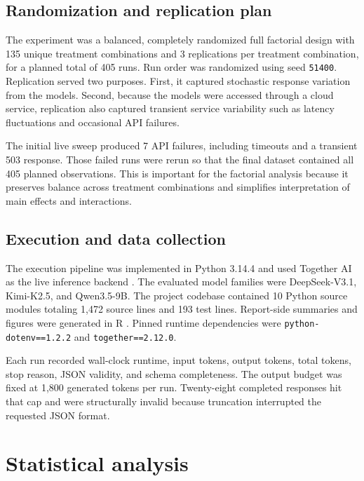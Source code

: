 \documentclass{article}
\begin{document}
\subsection{Randomization and replication plan}

The experiment was a balanced, completely randomized full factorial design with 135 unique treatment combinations and 3 replications per treatment combination, for a planned total of 405 runs. Run order was randomized using seed \texttt{51400}. Replication served two purposes. First, it captured stochastic response variation from the models. Second, because the models were accessed through a cloud service, replication also captured transient service variability such as latency fluctuations and occasional API failures.

The initial live sweep produced 7 API failures, including timeouts and a transient 503 response. Those failed runs were rerun so that the final dataset contained all 405 planned observations. This is important for the factorial analysis because it preserves balance across treatment combinations and simplifies interpretation of main effects and interactions.

\subsection{Execution and data collection}

The execution pipeline was implemented in Python 3.14.4 \cite{python} and used Together AI as the live inference backend \cite{togetherchat,togetherjson,togethermodels}. The evaluated model families were DeepSeek-V3.1, Kimi-K2.5, and Qwen3.5-9B. The project codebase contained 10 Python source modules totaling 1{,}472 source lines and 193 test lines. Report-side summaries and figures were generated in R \cite{rcore}. Pinned runtime dependencies were \texttt{python-dotenv==1.2.2} and \texttt{together==2.12.0}.

Each run recorded wall-clock runtime, input tokens, output tokens, total tokens, stop reason, JSON validity, and schema completeness. The output budget was fixed at 1{,}800 generated tokens per run. Twenty-eight completed responses hit that cap and were structurally invalid because truncation interrupted the requested JSON format.

\section{Statistical analysis}
\end{document}
